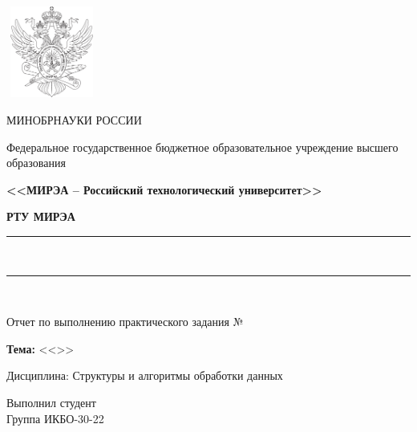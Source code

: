 
\begin{titlepage}
	\begin{center}
		\includegraphics[width=3cm,height=3cm]{MIREA_logo_bw.png}
		
		\hfill \break
		{\small МИНОБРНАУКИ РОССИИ}
		
		Федеральное государственное бюджетное образовательное учреждение высшего образования
		
		\textbf{<<МИРЭА – Российский технологический университет>>}
		
		\textbf{РТУ МИРЭА}
		
		\rule{\linewidth}{0.5pt} \\ [-0.65cm]
		\rule{\linewidth}{0.5pt} \\ [+0.35cm]
						
		\vspace{3cm}
		
		\makeatletter		
		\ifdefined\@worknum
		Отчет по выполнению практического задания №\@worknum
		\fi		

		\ifdefined\@topic						
		\textbf{Тема:} <<\@topic>>
		\fi
		
		\hfill \break
		Дисциплина: Структуры и алгоритмы обработки данных
		
		\vfill
		
		\ifdefined\@author
		Выполнил студент \hfill \@author \\
		Группа \hfill ИКБО-30-22 
		\fi
		
		\makeatother
		
		\vspace{4cm}
		
		\thispagestyle{titlepagefooter}
	\end{center}
	\clearpage
\end{titlepage}
